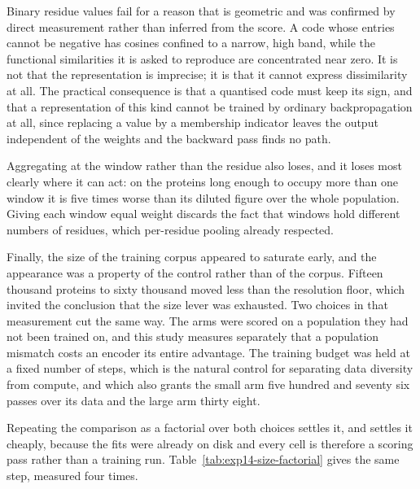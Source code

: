 Binary residue values fail for a reason that is geometric and was confirmed by direct
measurement rather than inferred from the score. A code whose entries cannot be
negative has cosines confined to a narrow, high band, while the functional
similarities it is asked to reproduce are concentrated near zero. It is not that the
representation is imprecise; it is that it cannot express dissimilarity at all. The
practical consequence is that a quantised code must keep its sign, and that a
representation of this kind cannot be trained by ordinary backpropagation at all,
since replacing a value by a membership indicator leaves the output independent of
the weights and the backward pass finds no path.

Aggregating at the window rather than the residue also loses, and it loses most
clearly where it can act: on the proteins long enough to occupy more than one window
it is five times worse than its diluted figure over the whole population. Giving each
window equal weight discards the fact that windows hold different numbers of
residues, which per-residue pooling already respected.

Finally, the size of the training corpus appeared to saturate early, and the
appearance was a property of the control rather than of the corpus. Fifteen thousand
proteins to sixty thousand moved less than the resolution floor, which invited the
conclusion that the size lever was exhausted. Two choices in that measurement cut the
same way. The arms were scored on a population they had not been trained on, and this
study measures separately that a population mismatch costs an encoder its entire
advantage. The training budget was held at a fixed number of steps, which is the
natural control for separating data diversity from compute, and which also grants the
small arm five hundred and seventy six passes over its data and the large arm thirty
eight.

Repeating the comparison as a factorial over both choices settles it, and settles it
cheaply, because the fits were already on disk and every cell is therefore a scoring
pass rather than a training run. Table~\ref{tab:exp14-size-factorial} gives the same
step, measured four times.

\begin{table}[htbp]
  \centering
  \caption{The step from fifteen thousand to sixty thousand training proteins,
  measured in all four combinations of scoring population and training budget. Every
  cell is a scoring pass over maps fitted beforehand, through one code path.
  $^{\dagger}$~below the resolution floor of Section~\ref{sec:exp14-floor}.}
  \label{tab:exp14-size-factorial}
  
\end{table}

